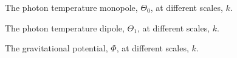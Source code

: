 \documentclass{aa}
\begin{document}
\begin{figure}[h!]
   \caption{The photon temperature monopole, $\Theta_0$, at different scales, $k$.}\label{fig:test3}
\end{figure}

\begin{figure}[h!]
   \caption{The photon temperature dipole, $\Theta_1$, at different scales, $k$.}\label{fig:test4}
\end{figure}

\begin{figure}[h!]
   \caption{The gravitational potential, $\Phi$, at different scales, $k$.}\label{fig:test5}
\end{figure}
\end{document}

